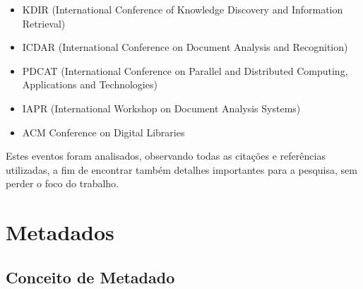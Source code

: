 \begin{itemize}
\item KDIR (International Conference of Knowledge Discovery and Information Retrieval)
\item ICDAR (International Conference on Document Analysis and Recognition)
\item PDCAT (International Conference on Parallel and Distributed Computing, Applications and Technologies)
\item IAPR (International Workshop on Document Analysis Systems)
\item ACM Conference on Digital Libraries
\end{itemize}

\begin{textoalterado}
Estes eventos foram analisados, observando todas as citações e referências utilizadas, a fim de encontrar também detalhes importantes para a pesquisa, sem perder o foco do trabalho.
\end{textoalterado}

\section{Metadados}


\subsection{Conceito de Metadado}

